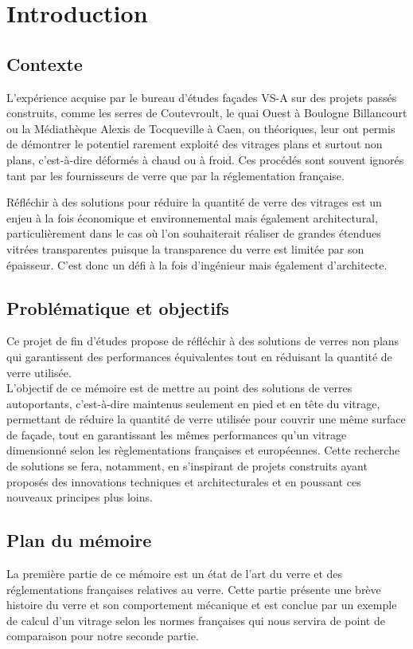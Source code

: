 \documentclass[11pt,titlepage]{article}
\begin{document}
\printglossary[type=\acronymtype,title=Liste des abréviations]
\newpage
\section{Introduction}

\subsection{Contexte}

L'expérience acquise par le bureau d'études façades VS-A sur des projets passés construits, comme les serres de Coutevroult, le quai Ouest à Boulogne Billancourt ou la Médiathèque Alexis de Tocqueville à Caen, ou théoriques, leur ont permis de démontrer le potentiel rarement exploité des vitrages plans et surtout non plans, c'est-à-dire déformés à chaud ou à froid. Ces procédés sont souvent ignorés tant par les fournisseurs de verre que par la réglementation française.

Réfléchir à des solutions pour réduire la quantité de verre des vitrages est un enjeu à la fois économique et environnemental mais également architectural, particulièrement dans le cas où l'on souhaiterait réaliser de grandes étendues vitrées transparentes puisque la transparence du verre est limitée par son épaisseur. C'est donc un défi à la fois d'ingénieur mais également d'architecte.

\subsection{Problématique et objectifs}

Ce projet de fin d'études propose de réfléchir à des solutions de verres non plans qui garantissent des performances équivalentes tout en réduisant la quantité de verre utilisée.
\\

L'objectif de ce mémoire est de mettre au point des solutions de verres autoportants, c'est-à-dire maintenus seulement en pied et en tête du vitrage, permettant de réduire la quantité de verre utilisée pour couvrir une même surface de façade, tout en garantissant les mêmes performances qu'un vitrage dimensionné selon les règlementations françaises et européennes. Cette recherche de solutions se fera, notamment, en s'inspirant de projets construits ayant proposés des innovations techniques et architecturales et en poussant ces nouveaux principes plus loins. 

\subsection{Plan du mémoire}
La première partie de ce mémoire est un état de l'art du verre et des réglementations françaises relatives au verre. Cette partie présente une brève histoire du verre et son comportement mécanique et est conclue par un exemple de calcul d'un vitrage selon les normes françaises qui nous servira de point de comparaison pour notre seconde partie.
\\
\end{document}

